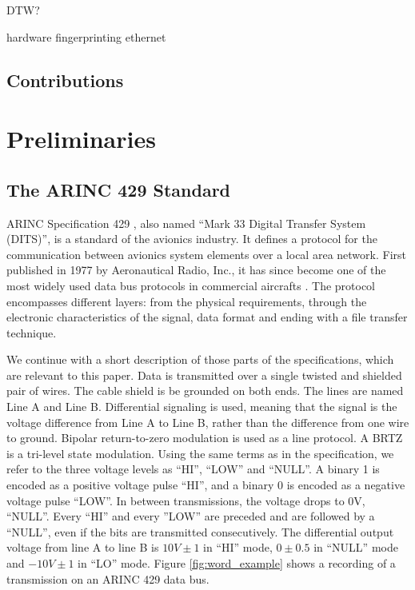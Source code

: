 \documentclass[conference]{IEEEtran}
\begin{document}
  DTW?

\color{gray}
hardware fingerprinting ethernet

\cite{kneib2018scission}
\color{black}


\subsection{Contributions}

\section{Preliminaries}
\subsection{The ARINC 429 Standard}
  ARINC Specification 429 \cite{}, also named ``Mark 33 Digital Transfer System (DITS)'', is a standard of the avionics industry. It defines a protocol for the communication between avionics system elements over a local area network. First published in 1977 by Aeronautical Radio, Inc., it has since become one of the most widely used data bus protocols in commercial aircrafts \cite{}. The protocol encompasses different layers: from the physical requirements, through the electronic characteristics of the signal, data format and ending with a file transfer technique.

  We continue with a short description of those parts of the specifications, which are relevant to this paper. Data is transmitted over a single twisted and shielded pair of wires. The cable shield is be grounded on both ends. The lines are named Line A and Line B. Differential signaling is used, meaning that the signal is the voltage difference from Line A to Line B, rather than the difference from one wire to ground. Bipolar return-to-zero modulation is used as a line protocol. A BRTZ is a tri-level state modulation. Using the same terms as in the specification, we refer to the three voltage levels as ``HI'', ``LOW'' and ``NULL''. A binary 1 is encoded as a positive voltage pulse ``HI'', and a binary 0 is encoded as a negative voltage pulse ``LOW''. In between transmissions, the voltage drops to 0V, ``NULL''. Every ``HI'' and every ''LOW'' are preceded and are followed by a ``NULL'', even if the bits are transmitted consecutively. The differential output voltage from line A to line B is $10V \pm 1$ in ``HI'' mode, $0 \pm 0.5$ in ``NULL'' mode and $-10V \pm 1$ in ``LO'' mode.  Figure \ref{fig:word_example} shows a recording of a transmission on an ARINC 429 data bus.
  
\end{document}
